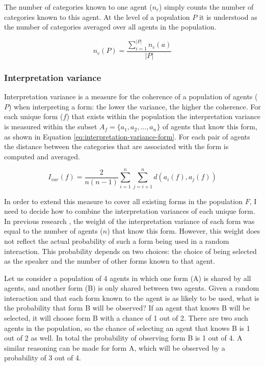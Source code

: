The number of categories known to one agent ($n_c$) simply counts the
number of categories known to this agent. At the level of a population
$P$ it is understood as the number of categories averaged over all
agents in the population.

\begin{equation}
n_c(P) = \frac{\displaystyle \sum_{i=1}^{|P|} n_c(a)}{|P|}
\label{eq:number-of-categories-population}
\end{equation}

\subsubsection{Interpretation variance}

Interpretation variance is a measure for the coherence of a population
of agents ($P$) when interpreting a form: the lower the variance, the
higher the coherence. For each unique form ($f$) that exists within
the population the interpretation variance is measured within the
subset $A_f = \{a_1, a_2, ..., a_n\}$ of agents that know this form,
as shown in Equation \ref{eq:interpretation-variance-form}. For each
pair of agents the distance between the categories that are associated
with the form is computed and averaged.

\begin{equation}
I_{var} (f) = \frac{2}{n(n-1)} \sum^n_{i=1} \sum^n_{j=i+1} d(a_i(f), a_j(f))
\label{eq:interpretation-variance-form}
\end{equation}

In order to extend this measure to cover all existing forms in the
population $F$, I need to decide how to combine the interpretation
variances of each unique form. In previous research
\citep[e.g.][]{belpaeme02factors}, the weight of the interpretation
variance of each form was equal to the number of agents ($n$) that
know this form. However, this weight does not reflect the actual
probability of such a form being used in a random interaction. This
probability depends on two choices: the choice of being selected as
the speaker and the number of other forms known to that agent.

Let us consider a population of 4 agents in which one form (A) is
shared by all agents, and another form (B) is only shared between two
agents. Given a random interaction and that each form known to the
agent is as likely to be used, what is the probability that form B
will be observed? If an agent that knows B will be selected, it will
choose form B with a chance of 1 out of 2. There are two such agents
in the population, so the chance of selecting an agent that knows B is
1 out of 2 as well. In total the probability of observing form B is 1
out of 4. A similar reasoning can be made for form A, which will be
observed by a probability of 3 out of 4.

